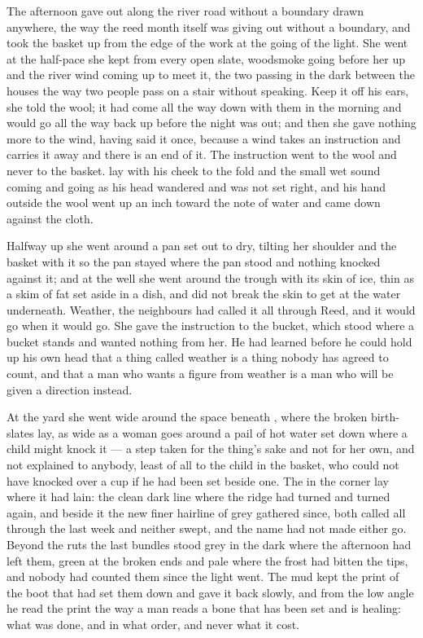 The afternoon gave out along the river road without a boundary drawn anywhere, the way the reed month itself was giving out without a boundary, and  took the basket up from the edge of the work at the going of the light. She went at the half-pace she kept from every open slate, woodsmoke going before her up  and the river wind coming up to meet it, the two passing in the dark between the houses the way two people pass on a stair without speaking. Keep it off his ears, she told the wool; it had come all the way down with them in the morning and would go all the way back up before the night was out; and then she gave nothing more to the wind, having said it once, because a wind takes an instruction and carries it away and there is an end of it. The instruction went to the wool and never to the basket.  lay with his cheek to the fold and the small wet sound coming and going as his head wandered and was not set right, and his hand outside the wool went up an inch toward the note of water and came down against the cloth.

Halfway up she went around a pan set out to dry, tilting her shoulder and the basket with it so the pan stayed where the pan stood and nothing knocked against it; and at the well she went around the trough with its skin of ice, thin as a skim of fat set aside in a dish, and did not break the skin to get at the water underneath. Weather, the neighbours had called it all through Reed, and it would go when it would go. She gave the instruction to the bucket, which stood where a bucket stands and wanted nothing from her. He had learned before he could hold up his own head that a thing called weather is a thing nobody has agreed to count, and that a man who wants a figure from weather is a man who will be given a direction instead.

At the yard she went wide around the space beneath , where the broken birth-slates lay, as wide as a woman goes around a pail of hot water set down where a child might knock it --- a step taken for the thing's sake and not for her own, and not explained to anybody, least of all to the child in the basket, who could not have knocked over a cup if he had been set beside one. The  in the corner lay where it had lain: the clean dark line where the ridge had turned and turned again, and beside it the new finer hairline of grey gathered since, both called  all through the last week and neither swept, and the name had not made either go. Beyond the ruts the last bundles stood grey in the dark where the afternoon had left them, green at the broken ends and pale where the frost had bitten the tips, and nobody had counted them since the light went. The mud kept the print of the boot that had set them down and gave it back slowly, and from the low angle he read the print the way a man reads a bone that has been set and is healing: what was done, and in what order, and never what it cost.


